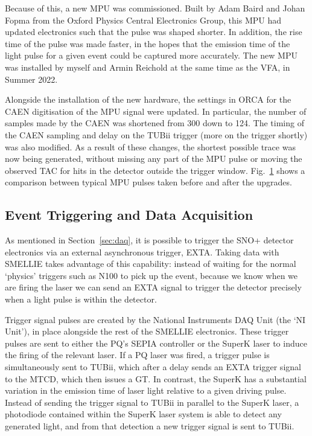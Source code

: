 Because of this, a new MPU was commissioned. Built by Adam Baird and Johan Fopma from the Oxford Physics Central Electronics Group, this MPU had updated electronics such that the pulse was shaped shorter. In addition, the rise time of the pulse was made faster, in the hopes that the emission time of the light pulse for a given event could be captured more accurately. The new MPU was installed by myself and Armin Reichold at the same time as the VFA, in Summer 2022.

Alongside the installation of the new hardware, the settings in ORCA for the CAEN digitisation of the MPU signal were updated. In particular, the number of samples made by the CAEN was shortened from 300 down to 124. The timing of the CAEN sampling and delay on the TUBii trigger (more on the trigger shortly) was also modified. As a result of these changes, the shortest possible trace was now being generated, without missing any part of the MPU pulse or moving the observed TAC for hits in the detector outside the trigger window. Fig.~\ref{fig:caen_trace_comparison} shows a comparison between typical MPU pulses taken before and after the upgrades.

\begin{figure}
    \centering
    \caption[]{}
    \label{fig:caen_trace_comparison}
\end{figure}

\subsection{Event Triggering and Data Acquisition}\label{sec:smellie_triggering_daq}
As mentioned in Section~\ref{sec:daq}, it is possible to trigger the SNO+ detector electronics via an external asynchronous trigger, EXTA. Taking data with SMELLIE takes advantage of this capability: instead of waiting for the normal `physics' triggers such as N100 to pick up the event, because we know when we are firing the laser we can send an EXTA signal to trigger the detector precisely when a light pulse is within the detector.

Trigger signal pulses are created by the National Instruments DAQ Unit (the `NI Unit'), in place alongside the rest of the SMELLIE electronics. These trigger pulses are sent to either the PQ's SEPIA controller or the SuperK laser to induce the firing of the relevant laser. If a PQ laser was fired, a trigger pulse is simultaneously sent to TUBii, which after a delay sends an EXTA trigger signal to the MTCD, which then issues a GT. In contrast, the SuperK has a substantial variation in the emission time of laser light relative to a given driving pulse. Instead of sending the trigger signal to TUBii in parallel to the SuperK laser, a photodiode contained within the SuperK laser system is able to detect any generated light, and from that detection a new trigger signal is sent to TUBii.

